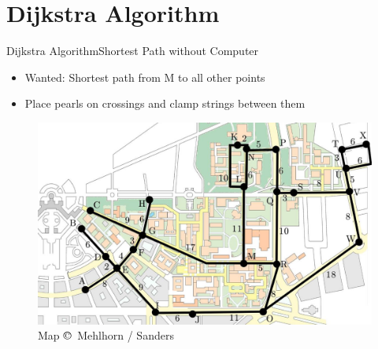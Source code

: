 \section{Dijkstra Algorithm}

\begin{frame}{Dijkstra Algorithm}{Shortest Path without Computer}
  \begin{itemize}
    \item
      Wanted: Shortest path from M to all other points
    \item
      Place pearls on crossings and clamp strings between them
  \end{itemize}
  \begin{figure}
    \includegraphics[width=0.75\linewidth]{Images/Dijkstra/DijkstraMap}
    \caption{Map $\copyright\,$ Mehlhorn / Sanders}
  \end{figure}
\end{frame}



